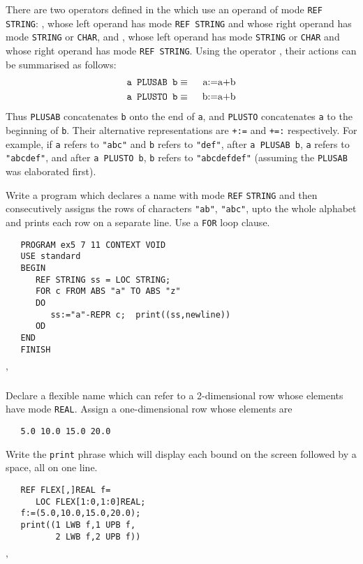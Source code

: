 There are two operators defined in the  which
use an operand of mode \verb|REF STRING|: , whose left
operand has mode \verb|REF STRING| and whose right operand has mode
\verb|STRING| or \verb|CHAR|, and , whose left operand
has mode \verb|STRING| or \verb|CHAR| and whose right operand has
mode \verb|REF STRING|.  Using the  operator
\ixtt{+}, their actions can be summarised as follows:
\begin{eqnarray*}
   \hbox{\tt a PLUSAB b}&\equiv&\hbox{\enskip a:=a+b}\\
   \hbox{\tt a PLUSTO b}&\equiv&\hbox{\enskip b:=a+b}
\end{eqnarray*}
Thus \verb|PLUSAB| concatenates \verb|b| onto the end of \verb|a|,
and \verb|PLUSTO| concatenates \verb|a| to the beginning of \verb|b|.
Their alternative representations are \verb|+:=| and \verb|+=:|
respectively. For example, if \verb|a| refers to \verb|"abc"| and
\verb|b| refers to \verb|"def"|, after \verb|a PLUSAB b|, \verb|a|
refers to \verb|"abcdef"|, and after \verb|a PLUSTO b|, \verb|b|
refers to \verb|"abcdefdef"| (assuming the \verb|PLUSAB| was
elaborated first).

\begin{exercise}
\item Write a program which declares a name with mode \verb|REF|
\verb|STRING| and then consecutively assigns the rows of characters
\verb|"ab"|, \verb|"abc"|, upto the whole alphabet and prints each
row on a separate line. Use a \verb|FOR| loop clause.  \ans \ %
\begin{verbatim}
   PROGRAM ex5 7 11 CONTEXT VOID
   USE standard
   BEGIN
      REF STRING ss = LOC STRING;
      FOR c FROM ABS "a" TO ABS "z"
      DO
         ss:="a"-REPR c;  print((ss,newline))
      OD
   END
   FINISH
\end{verbatim}
'
\item Declare a flexible name which can refer to a 2-dimen\-sional row
whose elements have mode \verb|REAL|.  Assign a one-dimensional row
whose elements are
\begin{verbatim}
   5.0 10.0 15.0 20.0
\end{verbatim}
\noindent
Write the \verb|print| phrase which will display each bound on the screen
followed by a space, all on one line. \ans \ %
\begin{verbatim}
   REF FLEX[,]REAL f=
      LOC FLEX[1:0,1:0]REAL;
   f:=(5.0,10.0,15.0,20.0);
   print((1 LWB f,1 UPB f,
          2 LWB f,2 UPB f))
\end{verbatim}
'
\end{exercise}

